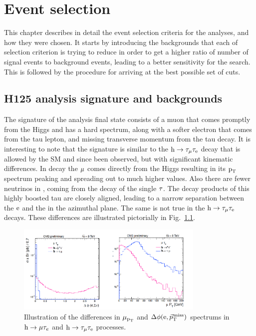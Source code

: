 \chapter{Event selection}
\label{event_selection}
This chapter describes in detail the event selection criteria for the analyses, and how they were chosen. It starts by introducing the backgrounds that each of selection criterion is trying to reduce in order to get a higher ratio of number of signal events to background events, leading to a better sensitivity for the search. This is followed by the procedure for arriving at the best possible set of cuts.

\section{H125 analysis signature and backgrounds}
\label{h125_evt_selec}
The signature of the \hmue analysis final state consists of a muon that comes promptly from the Higgs and has a hard \pt spectrum, along with a softer electron that comes from the tau lepton, and missing transverse momentum from the tau decay. It is interesting to note that the signature is similar to the $\text{h} \to \tau_{\mu}\tau_{\text{e}}$ decay that is allowed by the SM and since been observed, but with significant kinematic differences. In \hmue decay the $\mu$ comes directly from the Higgs resulting in its $\text{p}_\text{T}$ spectrum peaking and spreading out to much higher values. Also there are fewer neutrinos in \hmue, coming from the decay of the single $\tau$. The decay products of this highly boosted tau are closely aligned, leading to a narrow separation between the $\text{e}$ and the \ptvecmiss in the azimuthal plane. The same is not true in the $\text{h} \to \tau_{\mu}\tau_{\text{e}}$ decays. These differences are illustrated pictorially in Fig.~\ref{fig:htt_v_lfv}.

\begin{figure}
\begin{center}
\includegraphics[width=0.8\textwidth,keepaspectratio]{plots_and_figures/chapter5/htt_v_lfv.pdf}
\caption{Illustration of the differences in $\mu_{\text{p}_\text{T}}$ and $\Delta\phi(\text{e}, {\vec p}_{\mathrm{T}}^{\kern1pt\text{miss}})$ spectrums in $\text{h} \to \mu \tau_{e}$ and $\text{h} \to \tau_{\mu}\tau_{\text{e}}$ processes.}
\label{fig:htt_v_lfv}
\end{center}
\end{figure}

